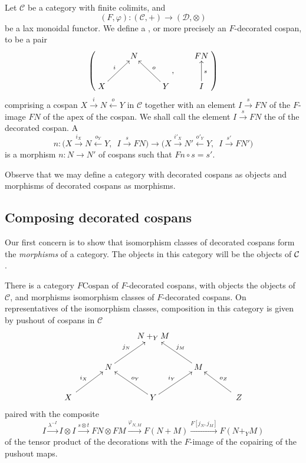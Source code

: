 \begin{definition} \label{def:fcospans}
  Let $\mathcal C$ be a category with finite colimits, and
  \[
    (F,\varphi)\colon  (\mathcal C,+) \longrightarrow (\mathcal D, \otimes)
  \]
  be a lax monoidal functor. We define a , or more
  precisely an $F$-decorated cospan, to be a pair 
  \[
    \left(
    \begin{aligned}
      \xymatrix{
	& N \\  
	X \ar[ur]^{i} && Y \ar[ul]_{o}
      }
    \end{aligned}
    ,
    \qquad
    \begin{aligned}
      \xymatrix{
	FN \\
	I \ar[u]_{s}
      }
    \end{aligned}
    \right)
  \]
  comprising a cospan $X \stackrel{i}\rightarrow N \stackrel{o}\leftarrow Y$ in
  $\mathcal C$ together with an element $I \stackrel{s}\rightarrow FN$ of
  the $F$-image $FN$ of the apex of the cospan. We shall call the element $I
  \stackrel{s}\rightarrow FN$ the  of the decorated
  cospan. A 
  \[
    n\colon  \big(X \stackrel{i_X}\longrightarrow N \stackrel{o_Y}\longleftarrow
    Y,\enspace I \stackrel{s}\longrightarrow FN\big) \longrightarrow \big(X
    \stackrel{i'_X}\longrightarrow N' \stackrel{o'_Y}\longleftarrow Y,\enspace I
    \stackrel{s'}\longrightarrow FN'\big)
  \]
  is a morphism $n\colon  N \to N'$ of cospans such that $Fn \circ s = s'$.
\end{definition}

Observe that we may define a category with decorated cospans as objects and
morphisms of decorated cospans as morphisms.


\subsection{Composing decorated cospans}

Our first concern is to show that isomorphism classes of decorated cospans form
the \emph{morphisms} of a category. The objects in this category will be the
objects of $\mathcal C$.

\begin{proposition} \label{prop.composingdeccospans}
  There is a category $F\mathrm{Cospan}$ of $F$-decorated cospans, with objects
  the objects of $\mathcal C$, and morphisms isomorphism classes of
  $F$-decorated cospans. On representatives of the isomorphism classes,
  composition in this category is given by pushout of cospans in $\mathcal C$
  \[
    \xymatrix{
      && N+_YM \\
      & N \ar[ur]^{j_N} && M \ar[ul]_{j_M} \\
      \quad X \quad \ar[ur]^{i_X} && Y \ar[ul]_{o_Y} \ar[ur]^{i_Y} && \quad Z
      \quad \ar[ul]_{o_Z}
    }
  \]
  paired with the composite
  \[
    I \stackrel{\lambda^{-I}}\longrightarrow I \otimes I \stackrel{s \otimes
    t}\longrightarrow FN \otimes FM \stackrel{\varphi_{N,M}}\longrightarrow
    F(N+M) \stackrel{F[j_N,j_M]}\longrightarrow F(N+_YM)
  \]
  of the tensor product of the decorations with the $F$-image of the copairing
  of the pushout maps.
\end{proposition}

